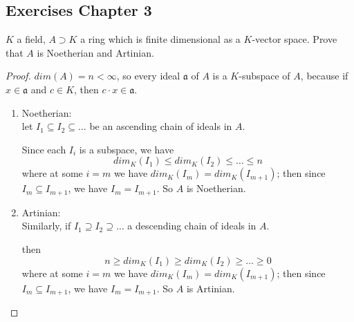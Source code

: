\documentclass{article}
\theoremstyle{definition}
\newenvironment{ex}[1]
{\renewcommand\theinnerex{#1}\innerex}
{\endinnerex}
\newcommand{\aA}{\mathfrak{a}} %
\begin{document}
\subsection{Exercises Chapter 3}

\begin{ex}{R.3.2}
  $K$ a field, $A \supset K$ a ring which is finite dimensional as a $K$-vector space.
   Prove that $A$ is Noetherian and Artinian.
\end{ex}
\begin{proof}
  $dim(A)=n < \infty$, so every ideal $\aA$ of $A$ is a $K$-subspace of $A$, because if $x \in \aA$ and $c \in K$, then $c \cdot x \in \aA$.

  \begin{enumerate}
    \item Noetherian:\\
      let $I_1 \subseteq I_2 \subseteq \ldots$ be an ascending chain of ideals in $A$.

      Since each $I_i$ is a subspace, we have
      $$dim_K(I_1) \leq dim_K(I_2) \leq \ldots \leq n$$
      where at some $i=m$ we have $dim_K(I_m)=dim_K(I_{m+1})$; then since $I_m \subseteq I_{m+1}$, we have $I_m = I_{m+1}$. So $A$ is Noetherian.
      
    \item Artinian:\\
      Similarly, if $I_1 \supseteq I_2 \supseteq \ldots$ a descending chain of ideals in $A$.

      then
      $$n \geq dim_K(I_1) \geq dim_K(I_2) \geq \ldots \geq 0$$
      where at some $i=m$ we have $dim_K(I_m)=dim_K(I_{m+1})$; then since $I_m \subseteq I_{m+1}$, we have $I_m = I_{m+1}$. So $A$ is Artinian.
  \end{enumerate}
\end{proof}
\end{document}
